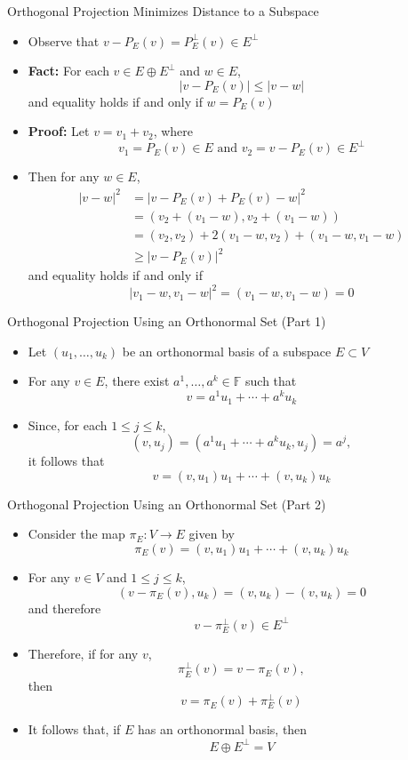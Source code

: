 \documentclass[usenames,dvipsnames,10pt]{beamer}
\newcommand\F{\mathbb{F}}
\begin{document}
\begin{frame}
  {Orthogonal Projection Minimizes Distance to a Subspace}

  \begin{itemize}
  \item Observe that $v - P_E(v) = P^\perp_E(v) \in E^\perp$
  \item {\bf Fact: }For each $v \in E\oplus E^\perp$ and $w \in E$,
    \[
      |v-P_E(v)| \le |v-w|
    \]
    and equality holds if and only if $w = P_E(v)$
  \item {\bf Proof:} Let $v = v_1 + v_2$, where
    \[ v_1=P_E(v)\in E\text{ and }v_2 = v-P_E(v) \in E^\perp \]
  \item Then for any $w \in E$,
    \begin{align*}
      |v-w|^2 &= |v-P_E(v)+P_E(v)-w|^2\\
              &= (v_2+(v_1-w),v_2+(v_1-w))\\
              &= (v_2,v_2) + 2(v_1-w,v_2) + (v_1-w,v_1-w)\\
              &\ge |v-P_E(v)|^2
    \end{align*}
    and equality holds if and only if
    \[
      |v_1-w,v_1-w|^2 = (v_1-w,v_1-w) = 0
    \]
  \end{itemize}
\end{frame}

\begin{frame}
  {Orthogonal Projection Using an Orthonormal Set (Part 1)}

  \begin{itemize}
  \item Let $(u_1, \dots, u_k)$ be an orthonormal basis of a subspace $E \subset V$
  \item For any $v \in E$, there exist $a^1, \dots, a^k \in \F$ such that
    \[ v = a^1u_1 + \cdots + a^ku_k \]
  \item Since, for each $1 \le j \le k$,
    \[ (v,u_j) = (a^1u_1 + \cdots + a^ku_k, u_j) = a^j, \]
    it follows that
    \[ v = (v,u_1)u_1 + \cdots + (v,u_k)u_k \]
  \end{itemize}
\end{frame}

\begin{frame}
  {Orthogonal Projection Using an Orthonormal Set (Part 2)}

  \begin{itemize}
  \item Consider the map $\pi_E: V \rightarrow E$ given by
    \[
      \pi_E(v) = (v,u_1)u_1 + \cdots + (v,u_k)u_k
    \]
  \item For any $v \in V$ and $1 \le j \le k$,
    \[
      (v - \pi_E(v),u_k) = (v,u_k) - (v,u_k) = 0
    \]
    and therefore
    \[
      v-\pi_E^\perp(v) \in E^\perp
    \]
  \item Therefore, if for any $v$,
    \[ \pi_E^\perp(v) = v - \pi_E(v), \]
    then
    \[ v = \pi_E(v) + \pi_E^\perp(v) \]
  \item It follows that, if $E$ has an orthonormal basis, then
    \[
      E\oplus E^\perp = V
    \]
  \end{itemize}
\end{frame}
\end{document}
